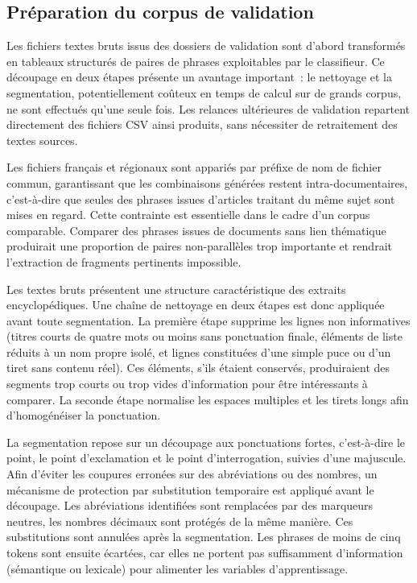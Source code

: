 \newpage

\subsection{Préparation du corpus de validation} \label{prepa_corpus_v}

Les fichiers textes bruts issus des dossiers de validation sont d'abord transformés en tableaux
structurés de paires de phrases exploitables par le classifieur. Ce découpage en deux étapes présente un
avantage important~: le nettoyage et la segmentation, potentiellement coûteux en temps de calcul
sur de grands corpus, ne sont effectués qu'une seule fois. Les relances ultérieures de validation
repartent directement des fichiers CSV ainsi produits, sans nécessiter de retraitement des textes sources.

Les fichiers français et régionaux sont appariés par préfixe de nom
de fichier commun, garantissant que les combinaisons générées restent intra-documentaires, c'est-à-dire
que seules des phrases issues d'articles traitant du même sujet sont mises en regard. Cette contrainte
est essentielle dans le cadre d'un corpus comparable. Comparer des phrases issues de documents sans
lien thématique produirait une proportion de paires non-parallèles trop importante et rendrait l'extraction de
fragments pertinents impossible.

Les textes bruts présentent une structure caractéristique des extraits encyclopédiques.
Une chaîne de nettoyage en deux étapes est donc appliquée avant toute segmentation. La première étape
supprime les lignes non informatives (titres courts de quatre mots ou moins sans ponctuation finale,
éléments de liste réduits à un nom propre isolé, et lignes constituées d'une simple puce ou d'un
tiret sans contenu réel). Ces éléments, s'ils étaient conservés, produiraient des segments trop courts ou
trop vides d'information pour être intéressants à comparer. La seconde étape normalise les espaces multiples
et les tirets longs afin d'homogénéiser la ponctuation.

La segmentation repose sur un découpage aux ponctuations fortes, c'est-à-dire le point, le
point d'exclamation et le point d'interrogation, suivies d'une majuscule. Afin d'éviter les coupures
erronées sur des abréviations ou des nombres, un mécanisme de protection par
substitution temporaire est appliqué avant le découpage. Les abréviations identifiées sont remplacées
par des marqueurs neutres, les nombres décimaux sont protégés de la même manière. Ces substitutions
sont annulées après la segmentation. Les phrases de moins de cinq tokens sont ensuite écartées, car elles
ne portent pas suffisamment d'information (sémantique ou lexicale) pour alimenter les variables d'apprentissage.

